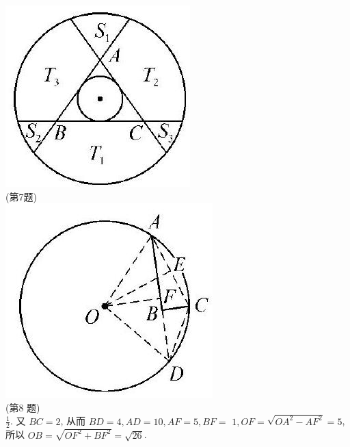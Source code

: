\documentclass[10pt]{article}
\begin{document}
\includegraphics[max width=\textwidth, center]{2024_10_30_66b8e5e701da2093c133g-088(2)}\\
(第7题)\\
\includegraphics[max width=\textwidth, center]{2024_10_30_66b8e5e701da2093c133g-088(1)}\\
(第8 题)\\
$\frac{1}{2}$. 又 $B C=2$, 从而 $B D=4, A D=10, A F=5, B F=$ $1, O F=\sqrt{O A^{2}-A F^{2}}=5$, 所以 $O B=\sqrt{O F^{2}+B F^{2}}=\sqrt{26}$.
\end{document}
